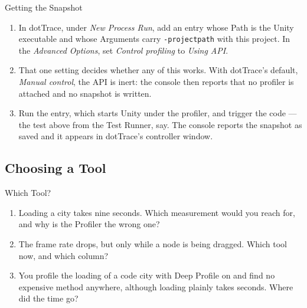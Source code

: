 \begin{frame}{Getting the Snapshot}
  \begin{enumerate}
    \item In dotTrace, under \emph{New Process Run}, add an entry whose Path is
      the Unity executable and whose Arguments carry
      \texttt{-projectpath} with this project. In the \emph{Advanced Options},
      set \emph{Control profiling} to \emph{Using API}.
    \item That one setting decides whether any of this works. With dotTrace's
      default, \emph{Manual control}, the API is inert: the console then reports
      that no profiler is attached and no snapshot is written.
    \item Run the entry, which starts Unity under the profiler, and trigger the
      code --- the test above from the Test Runner, say. The console reports the
      snapshot as saved and it appears in dotTrace's controller window.
  \end{enumerate}
  \vspace{1ex}

\end{frame}

\subsection{Choosing a Tool}

\begin{exerciseframe}{Which Tool?}
  \begin{enumerate}
    \item Loading a city takes nine seconds. Which measurement would you
      reach for, and why is the Profiler the wrong one?
    \item The frame rate drops, but only while a node is being dragged.
      Which tool now, and which column?
    \item You profile the loading of a code city with Deep Profile on and find
      no expensive method anywhere, although loading plainly takes seconds.
      Where did the time go?
  \end{enumerate}
\end{exerciseframe}

